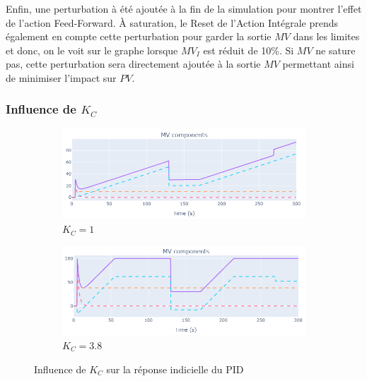 Enfin, une perturbation à été ajoutée à la fin de la simulation pour montrer l'effet de l'action Feed-Forward.
À saturation, le Reset de l'Action Intégrale prends également en compte cette perturbation pour garder la sortie $MV$ dans les limites et donc, on le voit sur le graphe lorsque $MV_I$ est réduit de 10\%.
Si $MV$ ne sature pas, cette perturbation sera directement ajoutée à la sortie $MV$ permettant ainsi de minimiser l'impact sur $PV$.

\subsubsection{Influence de \texorpdfstring{$K_C$}{Kc}}
\begin{figure}[H]
    \centering
    \begin{subfigure}[b]{0.48\textwidth}
        \includegraphics[width=\textwidth]{../Plots/PID/PID_Response_low_Kc.png}
        \caption{$K_C = 1$}
    \end{subfigure}
    \begin{subfigure}[b]{0.48\textwidth}
        \includegraphics[width=\textwidth]{../Plots/PID/PID_Response_high_Kc.png}
        \caption{$K_C = 3.8$}
    \end{subfigure}
    \caption{Influence de $K_C$ sur la réponse indicielle du PID}
    \label{fig:Kc_Influence_PID}
\end{figure}

